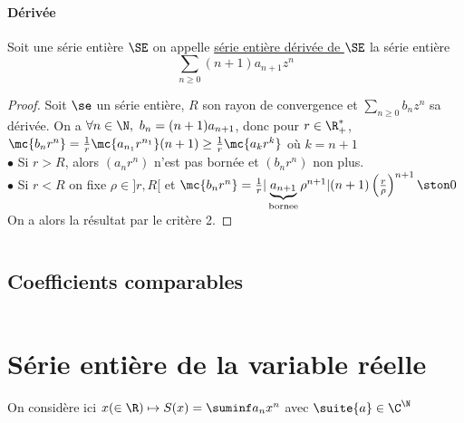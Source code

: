 		\paragraph{Dérivée}
			Soit une série entière $\SE$ on appelle \uline{série entière dérivée de $\SE$} la série entière \[ \sum_{n\geq 0} (n+1)a_{n+1}z^n \] \trait
		\begin{proof}
		Soit $\se$ un série entière, $R$ son rayon de convergence et $\sum_{n\geq 0} b_nz^n$ sa dérivée. On a $\forall n\in\N ,~ b_n=(n+1)a_{n+1}$, donc pour $r\in\R_+^*$, $\mc{b_nr^n} = \frac{1}{r} \mc{a_{n_1} r^{n_1} }(n+1) \geq \frac{1}{r} \mc{a_kr^k}$ où $k=n+1$ \\
		$\bullet$ Si $r>R$, alors $(a_nr^n)$ n'est pas bornée et $(b_nr^n)$ non plus.\\
		$\bullet$ Si $r<R$ on fixe $\rho \in ]r,R[$ et $\mc{b_nr^n} = \frac{1}{r}\vert\underbrace{a_{n+1}}_{\mathrm{bornee}}\rho^{n+1}\vert(n+1)\left( \frac{r}{\rho}\right)^{n+1} \ston 0$\\
		On a alors la résultat par le critère 2.
		\end{proof}
		${}$ \\ 
	\subsection{Coefficients comparables}
		${}$ \\ 
	\section{Série entière de la variable réelle}
		On considère ici $x (\in\R) \mapsto S(x) = \suminf a_nx^n$ avec $\suite{a}\in\C^\N$
